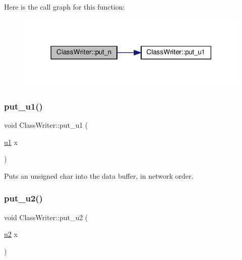 Here is the call graph for this function\+:\nopagebreak
\begin{figure}[H]
\begin{center}
\leavevmode
\includegraphics[width=318pt]{classClassWriter_aa527b917e9f3628ceaeccb95d30bfbb9_cgraph}
\end{center}
\end{figure}
\mbox{\label{classClassWriter_a07332eb8e8e5ead72834e286cf8a6bd4}} 
\subsubsection{\texorpdfstring{put\+\_\+u1()}{put\_u1()}}
{\footnotesize\ttfamily void Class\+Writer\+::put\+\_\+u1 (\begin{DoxyParamCaption}\item[{\hyperlink{types_8h_a162f47a77ee24f6f77cd8c82ccd40ab7}{u1}}]{x }\end{DoxyParamCaption})\hspace{0.3cm}{\ttfamily [private]}}



Puts an unsigned char into the data buffer, in network order. 

\mbox{\label{classClassWriter_a0304019dd68dd830fac5c67971ed2070}} 
\subsubsection{\texorpdfstring{put\+\_\+u2()}{put\_u2()}}
{\footnotesize\ttfamily void Class\+Writer\+::put\+\_\+u2 (\begin{DoxyParamCaption}\item[{\hyperlink{types_8h_ae676e9207f57fb921dca7366b2f59c53}{u2}}]{x }\end{DoxyParamCaption})\hspace{0.3cm}{\ttfamily [private]}}



